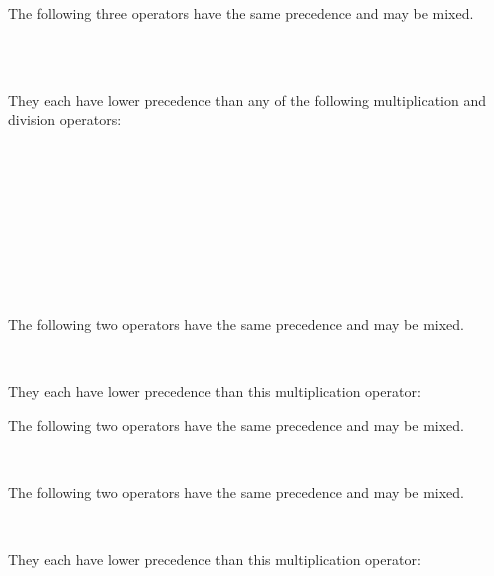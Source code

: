 The following three operators have the same precedence and may be mixed.
\begin{tabbing}
\UnicodeKillLine
{} \\
 \\
\end{tabbing}
They each have lower precedence than any of the following multiplication and division operators:
\begin{tabbing}
\UnicodeKillLine
{} \\
 \\
 \\
 \\
 \\
 \\
 \\
 \\
\end{tabbing}

The following two operators have the same precedence and may be mixed.
\begin{tabbing}
\UnicodeKillLine
{} \\
\end{tabbing}
They each have lower precedence than this multiplication operator:
\begin{tabbing}
\UnicodeKillLine
{}
\end{tabbing}

The following two operators have the same precedence and may be mixed.
\begin{tabbing}
\UnicodeKillLine
{} \\
\end{tabbing}

The following two operators have the same precedence and may be mixed.
\begin{tabbing}
\UnicodeKillLine
{} \\
\end{tabbing}
They each have lower precedence than this multiplication operator:
\begin{tabbing}
\UnicodeKillLine
{}
\end{tabbing}


